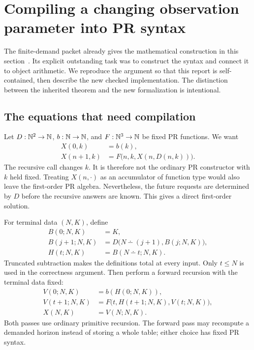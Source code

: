 \section{Compiling a changing observation parameter into PR syntax}
\label{sec:demand}

The finite-demand packet already gives the mathematical construction in
this section~\cite{repo-demand}. Its explicit outstanding task was to
construct the  syntax and connect it to object arithmetic.
We reproduce the argument so that this report is self-contained, then
describe the new checked implementation. The distinction between the
inherited theorem and the new formalization is intentional.

\subsection{The equations that need compilation}

Let \(D:\mathbb N^2\to\mathbb N\), \(b:\mathbb N\to\mathbb N\), and
\(F:\mathbb N^3\to\mathbb N\) be fixed PR functions. We want
\begin{align}
 X(0,k)&=b(k),\label{eq:demand-zero}\\
 X(n+1,k)&=F\bigl(n,k,X(n,D(n,k))\bigr).
 \label{eq:demand-successor}
\end{align}
The recursive call changes \(k\). It is therefore not the ordinary PR
constructor with \(k\) held fixed. Treating \(X(n,\cdot)\) as an
accumulator of function type would also leave the first-order PR algebra.
Nevertheless, the future requests are determined by \(D\) before the
recursive answers are known. This gives a direct first-order solution.

For terminal data \((N,K)\), define
\begin{align}
 B(0;N,K)&=K,\nonumber\\
 B(j+1;N,K)&=D\bigl(N\dotminus(j+1),B(j;N,K)\bigr),
 \label{eq:backward}\\
 H(t;N,K)&=B(N\dotminus t;N,K).
 \label{eq:horizon}
\end{align}
Truncated subtraction makes the definitions total at every input.
Only \(t\le N\) is used in the correctness argument.
Then perform a forward recursion with the terminal data fixed:
\begin{align}
 V(0;N,K)&=b(H(0;N,K)),\nonumber\\
 V(t+1;N,K)&=F\bigl(t,H(t+1;N,K),V(t;N,K)\bigr),
 \label{eq:forward}\\
 X(N,K)&=V(N;N,K).
 \label{eq:compiled}
\end{align}
Both passes use ordinary primitive recursion. The forward pass may
recompute a demanded horizon instead of storing a whole table; either
choice has fixed PR syntax.


